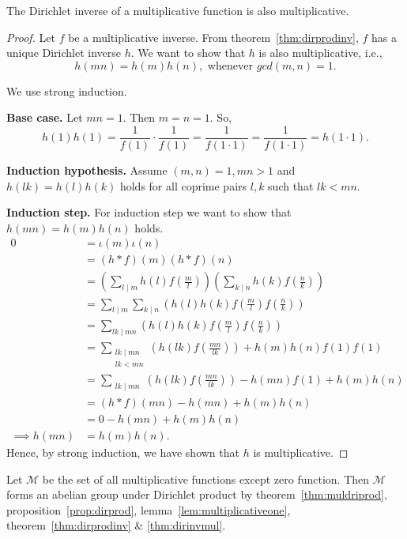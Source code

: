 \begin{theorem}\label{thm:dirinvmul}
    The Dirichlet inverse of a multiplicative function is also multiplicative.
\end{theorem}
\begin{proof}
    Let $f$ be a multiplicative inverse. From theorem~\ref{thm:dirprodinv}, $f$ has a unique Dirichlet inverse $h$. We want to show that $h$ is also multiplicative, i.e., \[h(mn) = h(m)h(n), \text{ whenever } gcd(m,n)=1.\]

    We use strong induction. 
    
    \textbf{Base case.} Let $mn = 1$. Then $m = n = 1$. So, \[h(1)h(1) = \frac{1}{f(1)} \cdot \frac{1}{f(1)} = \frac{1}{f(1\cdot1)} = \frac{1}{f(1 \cdot 1)} = h(1\cdot 1).\]

    \textbf{Induction hypothesis.} Assume $(m,n)=1, mn > 1$ and $h(lk) = h(l)h(k)$ holds for all coprime pairs $l, k$ such that $lk < mn$.

    \textbf{Induction step.} For induction step we want to show that $h(mn) = h(m)h(n)$ holds.
    \begin{align*}
        0 &= \iota(m)\iota(n)\\
          &= (h \ast f)(m)(h \ast f)(n)\\
          &= \left(\sum_{l \mid m} h(l)f\left(\frac{m}{l}\right)\right)\left(\sum_{k \mid n} h(k)f\left(\frac{n}{k}\right)\right)\\
          &= \sum_{l \mid m} \sum_{k \mid n} \left(h(l)h(k)f\left(\frac{m}{l}\right) f\left(\frac{n}{k}\right)\right)\\
          &= \sum_{lk \mid mn} \left(h(l)h(k)f\left(\frac{m}{l}\right) f\left(\frac{n}{k}\right)\right)\\
          &= \sum_{\substack{lk \mid mn \\ lk < mn}} \left(h(lk) f\left(\frac{mn}{lk}\right)\right) + h(m)h(n)f(1)f(1)\\
          &= \sum_{\substack{lk \mid mn}} \left(h(lk) f\left(\frac{mn}{lk}\right)\right) - h(mn)f(1) + h(m)h(n)\\
          &= (h \ast f)(mn) - h(mn) + h(m)h(n)\\
          &= 0 - h(mn) + h(m)h(n)\\
        \implies h(mn) &= h(m)h(n).
    \end{align*}
    Hence, by strong induction, we have shown that $h$ is multiplicative.
\end{proof}

\begin{remark}
    Let $\mathcal{M}$ be the set of all multiplicative functions except zero function. Then $\mathcal{M}$ forms an abelian group under Dirichlet product by theorem~\ref{thm:muldriprod}, proposition~\ref{prop:dirprod}, lemma~\ref{lem:multiplicativeone}, theorem~\ref{thm:dirprodinv} \& \ref{thm:dirinvmul}.
\end{remark}

